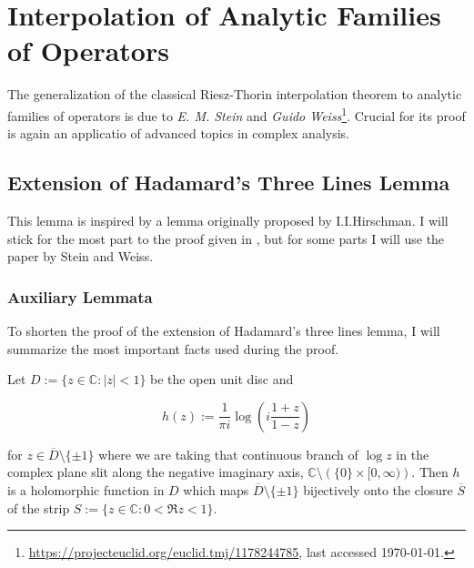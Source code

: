 \section{Interpolation of Analytic Families of Operators}
The generalization of the classical Riesz-Thorin interpolation theorem to analytic families of operators is due to \emph{E. M. Stein} and \emph{Guido  Weiss}\footnote{\href{https://projecteuclid.org/euclid.tmj/1178244785}{https://projecteuclid.org/euclid.tmj/1178244785}, last accessed \today.}. Crucial for its proof is again an applicatio of advanced topics in complex analysis.

\subsection{Extension of Hadamard's Three Lines Lemma}
This lemma is inspired by a lemma originally proposed by I.I.Hirschman. I will stick for the most part to the proof given in \cite[43--45]{grafakos:fourier:2014}, but for some parts I will use the paper by Stein and Weiss.


\subsubsection{Auxiliary Lemmata} To shorten the proof of the extension of Hadamard's three lines lemma, I will summarize the most important facts used during the proof.

\begin{lemma}
	Let $D := \{z \in \mathbb{C} : \vert z \vert < 1\}$ be the open unit disc and 
	
	\begin{equation*}
		h(z) := \frac{1}{\pi i}\log\left( i\frac{1 + z}{1 - z} \right)
	\end{equation*}

	for $z \in \overline{D} \setminus \{\pm 1\}$ where we are taking that continuous branch of $\log z$ in the complex plane slit along the negative imaginary axis, $\mathbb{C} \setminus\left(\{0\} \times [0,\infty)\right)$. Then $h$ is a holomorphic function in $D$ which maps $\overline{D}\setminus \{\pm 1\}$ bijectively onto the closure $\overline{S}$ of the strip $S := \{z \in \mathbb{C} : 0 < \Re z < 1\}$.

	\label{lem:h}
\end{lemma}

